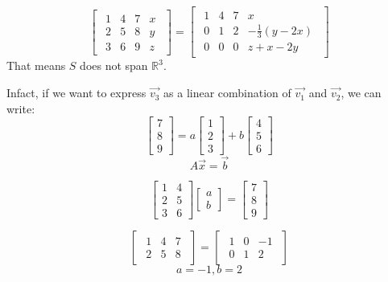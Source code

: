 \documentclass[oneside]{book}
\begin{document}
\[
    \begin{bmatrix}
        \begin{array}{ccc|c}
            1 & 4 & 7 & x\\
            2 & 5 & 8 & y\\
            3 & 6 & 9 & z
        \end{array}
    \end{bmatrix}
    = 
    \begin{bmatrix}
        \begin{array}{ccc|c}
            1 & 4 & 7 & x\\
            0 & 1 & 2 & - \frac{1}{3} (y - 2x)\\
            0 & 0 & 0 & z + x -2y
        \end{array}
    \end{bmatrix}
\]
That means $S$ does not span $\mathbb{R}^3$.

Infact, if we want to express $\vec{v_3}$ as a linear combination of $\vec{v_1}$ and $\vec{v_2}$, we can write:
\[
    \begin{bmatrix}
        7 \\ 8 \\ 9
    \end{bmatrix}
    = a \begin{bmatrix}
        1 \\ 2 \\ 3
    \end{bmatrix}
    + b \begin{bmatrix}
        4 \\ 5 \\ 6
    \end{bmatrix}
\]
\[
    A\vec{x} = \vec{b}
\]

\[
    \begin{bmatrix}
        1 & 4 \\
        2 & 5 \\
        3 & 6 
    \end{bmatrix}
    \begin{bmatrix}
        a \\ b
    \end{bmatrix}
    =
    \begin{bmatrix}
        7 \\ 8 \\ 9
    \end{bmatrix}
\]

\[
    \begin{bmatrix}
        \begin{array}{cc|c}
            1 & 4 & 7\\
            2 & 5 & 8
        \end{array}
    \end{bmatrix}
    = 
    \begin{bmatrix}
        \begin{array}{cc|c}
            1 & 0 & -1\\
            0 & 1 & 2
        \end{array}
    \end{bmatrix}
\]
\[
    a = -1, b = 2
\]
\end{document}
